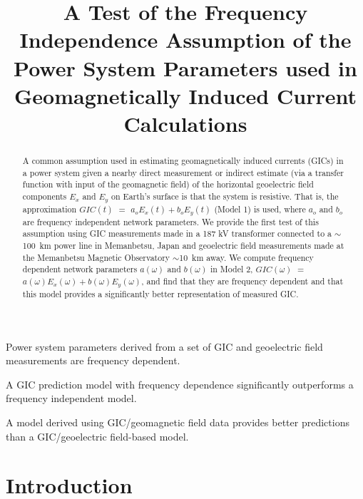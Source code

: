 \documentclass[draft,linenumbers]{agujournal2018}
\begin{document}

\title{A Test of the Frequency Independence Assumption of the Power System Parameters used in Geomagnetically Induced Current Calculations}





\begin{keypoints}
\item Power system parameters derived from a set of GIC and geoelectric field measurements are frequency dependent.
\item A GIC prediction model with frequency dependence significantly outperforms a frequency independent model.
\item A model derived using GIC/geomagnetic field data provides better predictions than a GIC/geoelectric field-based model.
\end{keypoints}

\begin{abstract}
A common assumption used in estimating geomagnetically induced currents (GICs) in a power system given a nearby direct measurement or indirect estimate (via a transfer function with input of the geomagnetic field) of the horizontal geoelectric field components $E_x$ and $E_y$ on Earth's surface is that the system is resistive. That is, the approximation $GIC(t)$  $=$ $a_oE_x(t) + b_oE_y(t)$ (Model 1) is used, where $a_o$ and $b_o$ are frequency independent network parameters.  We provide the first test of this assumption using GIC measurements made in a 187 kV transformer connected to a $\sim$100~km power line in Memanbetsu, Japan and geoelectric field measurements made at the Memanbetsu Magnetic Observatory $\sim$10~km  away.  We compute frequency dependent network parameters $a(\omega)$ and $b(\omega)$ in Model 2, $GIC(\omega)$ $=$ $a(\omega)E_x(\omega) + b(\omega)E_y(\omega)$, and find that they are frequency dependent and that this model provides a significantly better representation of measured GIC.
\end{abstract}

\section{Introduction}
\end{document}
